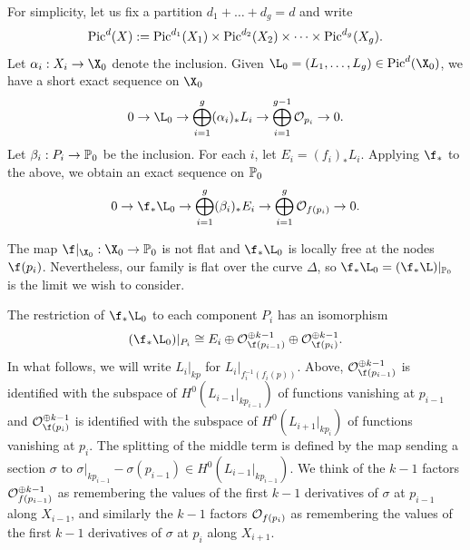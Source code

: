  For simplicity, let us fix a partition $d_1 + \ldots + d_g = d$ and
 write
 \[\Pic^d(X) := \Pic^{d_1}(X_1) \times \Pic^{d_2}(X_2) \times \cdots \times \Pic^{d_g}(X_g).\]
 Let $\alpha_i : X_i \rightarrow \X_0$ denote the inclusion.
 Given $\L_0 = (L_1, \ldots, L_g) \in \Pic^d(\X_0)$, we have a short exact sequence on $\X_0$
 \[0 \rightarrow \L_0 \rightarrow \bigoplus_{i=1}^g (\alpha_i)_* L_i \rightarrow \bigoplus_{i=1}^{g-1} \O_{p_i} \rightarrow 0.\]
Let $\beta_i : P_i \rightarrow \P_0$ be the inclusion.
For each $i$, let $E_i = (f_i)_* L_i$.
Applying $\f_*$ to the above, we obtain an exact sequence on $\P_0$
 \begin{equation} \label{flseq}\dcref{3.2}
\source{refined-brill-noether-theory-hurwitz-spaces}
 0 \rightarrow \f_*\L_0 \rightarrow \bigoplus_{i=1}^g (\beta_i)_*E_i \rightarrow \bigoplus_{i=1}^g \O_{f(p_i)} \rightarrow 0.
 \end{equation}
\begin{warning}
The map $\f|_{\X_0}: \X_0 \rightarrow \P_0$ is not flat and $\f_*\L_0$ is  locally free at the nodes $\f(p_i)$. Nevertheless, our family is flat over the curve $\Delta$, so $\f_*\L_0 = (\f_*\L)|_{\P_0}$ is the limit we wish to consider.
\end{warning}
The restriction of $\f_*\L_0$ to each component $P_i$ has an isomorphism
\begin{equation} \label{compiso}\dcref{3.3}
\source{refined-brill-noether-theory-hurwitz-spaces}
(\f_*\L_0)|_{P_i} \cong E_i \oplus \O_{\f(p_{i-1})}^{\oplus k-1} \oplus \O_{\f(p_i)}^{\oplus k-1}.
\end{equation}
In what follows, we will write $L_i|_{kp}$ for $L_i|_{f_i^{-1}(f_i(p))}$.
Above, $\O_{\f(p_{i-1})}^{\oplus k-1}$ is identified with the subspace of $H^0(L_{i-1}|_{kp_{i-1}})$ of functions vanishing at $p_{i-1}$ and
$\O_{\f(p_{i})}^{\oplus k-1}$ is identified with the subspace of $H^0(L_{i+1}|_{kp_i})$ of functions vanishing at $p_{i}$.
The splitting of the middle term is defined by the map sending a section $\sigma$ to $\sigma|_{kp_{i-1}} - \sigma(p_{i-1}) \in H^0(L_{i-1}|_{kp_{i-1}})$. We think of the $k-1$ factors $\O_{f(p_{i-1})}^{\oplus k-1}$ as remembering the values of the first $k-1$ derivatives of $\sigma$ at $p_{i-1}$ along $X_{i-1}$, and similarly the $k-1$ factors $\O_{f(p_{i})}$ as remembering the values of the first $k-1$ derivatives of $\sigma$ at $p_{i}$ along $X_{i+1}$.

